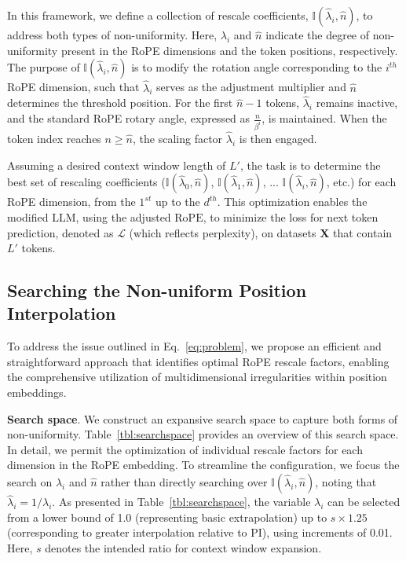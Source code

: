 In this framework, we define a collection of rescale coefficients, $\mathbb{I}(\hat{\lambda}_{i},\hat{n})$, to address both types of non-uniformity. Here, $\hat{\lambda_i}$ and $\hat{n}$ indicate the degree of non-uniformity present in the RoPE dimensions and the token positions, respectively. The purpose of $\mathbb{I}(\hat{\lambda}_{i},\hat{n})$ is to modify the rotation angle corresponding to the $i^{th}$ RoPE dimension, such that $\hat\lambda_{i}$ serves as the adjustment multiplier and $\hat{n}$ determines the threshold position. For the first $\hat{n}-1$ tokens, $\hat\lambda_{i}$ remains inactive, and the standard RoPE rotary angle, expressed as $\frac{n}{\beta^i}$, is maintained. When the token index reaches $n\ge\hat{n}$, the scaling factor $\hat\lambda_{i}$ is then engaged.

Assuming a desired context window length of $L'$, the task is to determine the best set of rescaling coefficients ($\mathbb{I}(\hat{\lambda}_{0},\hat{n})$, $\mathbb{I}(\hat{\lambda}_{1},\hat{n})$, ... $\mathbb{I}(\hat{\lambda}_{i},\hat{n})$, etc.) for each RoPE dimension, from the $1^{st}$ up to the $d^{th}$. This optimization enables the modified $\text{LLM}$, using the adjusted $\text{RoPE}$, to minimize the loss for next token prediction, denoted as $\mathcal{L}$ (which reflects perplexity), on datasets $\mathbf{X}$ that contain $L'$ tokens.

\subsection{Searching the Non-uniform Position Interpolation}

To address the issue outlined in Eq.~\ref{eq:problem}, we propose an efficient and straightforward approach that identifies optimal RoPE rescale factors, enabling the comprehensive utilization of multidimensional irregularities within position embeddings.

\textbf{Search space}. We construct an expansive search space to capture both forms of non-uniformity. Table~\ref{tbl:searchspace} provides an overview of this search space. In detail, we permit the optimization of individual rescale factors for each dimension in the RoPE embedding. To streamline the configuration, we focus the search on $\lambda_i$ and $\hat{n}$ rather than directly searching over $\mathbb{I}(\hat{\lambda}_{i},\hat{n})$, noting that $\hat{\lambda}_{i}=1/\lambda_i$. As presented in Table~\ref{tbl:searchspace}, the variable $\lambda_i$ can be selected from a lower bound of 1.0 (representing basic extrapolation) up to $s\times 1.25$ (corresponding to greater interpolation relative to PI), using increments of 0.01. Here, $s$ denotes the intended ratio for context window expansion.

